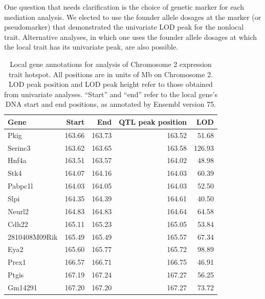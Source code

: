 \documentclass[oneside]{book}\usepackage[]{graphicx}\usepackage[]{color}
\begin{document}
One question that needs clarification is the choice of genetic marker 
for each mediation analysis. 
We elected to use the founder allele dosages at the marker (or pseudomarker) that demonstrated the 
univariate LOD peak for the nonlocal trait. 
Alternative analyses, in which one uses the founder allele dosages at which the 
local trait has its univariate peak, are also possible.




\begin{table}[ht]
\centering
\begin{tabular}{lrrrr}
  \hline
Gene & Start & End & QTL peak position & LOD\\
  \hline
Pkig & 163.66 & 163.73 & 163.52 & 51.68 \\
  Serinc3 & 163.62 & 163.65 & 163.58 & 126.93 \\
  Hnf4a & 163.51 & 163.57 & 164.02 & 48.98 \\
  Stk4 & 164.07 & 164.16 & 164.03 & 60.39 \\
  Pabpc1l & 164.03 & 164.05 & 164.03 & 52.50 \\
  Slpi & 164.35 & 164.39 & 164.61 & 40.50 \\
  Neurl2 & 164.83 & 164.83 & 164.64 & 64.58 \\
  Cdh22 & 165.11 & 165.23 & 165.05 & 53.84 \\
  2810408M09Rik & 165.49 & 165.49 & 165.57 & 67.34 \\
  Eya2 & 165.60 & 165.77 & 165.72 & 98.89 \\
  Prex1 & 166.57 & 166.71 & 166.75 & 46.91 \\
  Ptgis & 167.19 & 167.24 & 167.27 & 56.25 \\
  Gm14291 & 167.20 & 167.20 & 167.27 & 73.72 \\
   \hline
\end{tabular}
\caption{Local gene annotations for analysis of Chromosome 2 expression trait hotspot. 
All positions are in units of Mb on Chromosome 2. 
LOD peak position and LOD peak height refer to those obtained from univariate analyses. 
``Start'' and ``end'' refer to the local gene's DNA start and end positions, as annotated by Ensembl version 75.}
\label{tab:annot}
\end{table}
\end{document}

